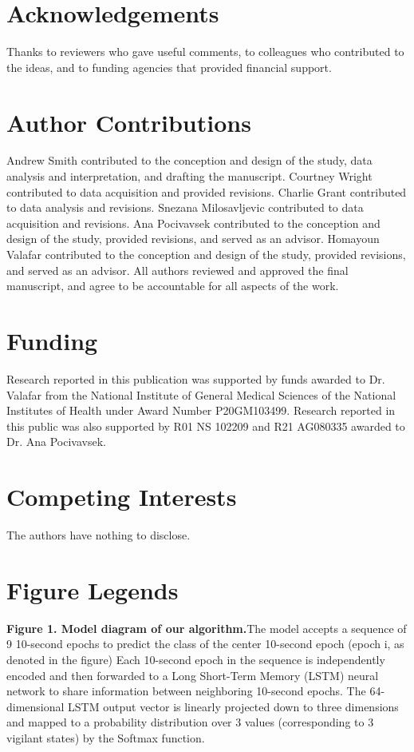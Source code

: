 \documentclass[pdflatex,sn-mathphys-num]{sn-jnl}%
\theoremstyle{thmstyleone}%
\theoremstyle{thmstyletwo}%
\theoremstyle{thmstylethree}%
\begin{document}
\section*{Acknowledgements}
Thanks to reviewers who gave useful comments, to colleagues who contributed to the ideas, and to funding agencies that provided financial support.
\section*{Author Contributions}
Andrew Smith contributed to the conception and design of the study, data analysis and interpretation, and drafting the manuscript. Courtney Wright contributed to data acquisition and provided revisions. Charlie Grant contributed to data analysis and revisions. Snezana Milosavljevic contributed to data acquisition and revisions. Ana Pocivavsek contributed to the conception and design of the study, provided revisions, and served as an advisor. Homayoun Valafar contributed to the conception and design of the study, provided revisions, and served as an advisor. All authors reviewed and approved the final manuscript, and agree to be accountable for all aspects of the work.
\section*{Funding}
Research reported in this publication was supported by funds awarded to Dr. Valafar from the National Institute of General Medical Sciences of the National Institutes of Health under Award Number P20GM103499. Research reported in this public was also supported by R01 NS 102209 and R21 AG080335 awarded to Dr. Ana Pocivavsek.
\section*{Competing Interests}
The authors have nothing to disclose.

\section*{Figure Legends}
\noindent
\textbf{Figure 1. Model diagram of our algorithm.}\quad The model accepts a sequence of 9 10-second epochs to predict the class of the center 10-second epoch (epoch i, as denoted in the figure) Each 10-second epoch in the sequence is independently encoded and then forwarded to a Long Short-Term Memory (LSTM) neural network to share information between neighboring 10-second epochs. The 64-dimensional LSTM output vector is linearly projected down to three dimensions and mapped to a probability distribution over 3 values (corresponding to 3 vigilant states) by the Softmax function.
\vspace{12pt} %
\end{document}
